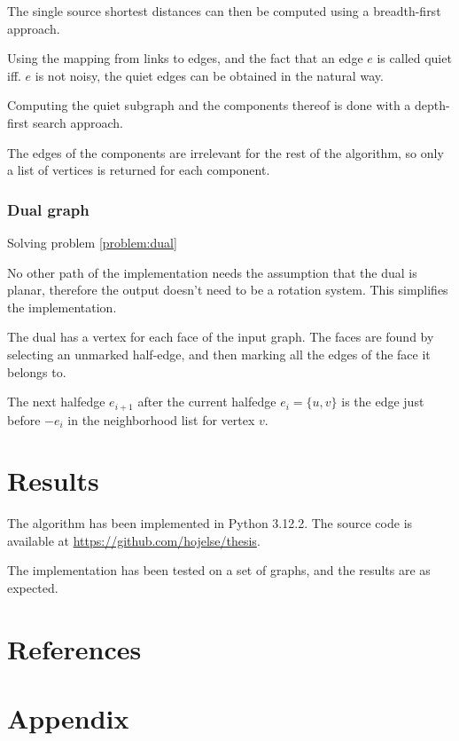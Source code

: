 \documentclass{article}
\begin{document}
			The single source shortest distances can then be computed using a breadth-first approach.

			Using the mapping from links to edges, and the fact that an edge $e$ is called quiet iff. $e$ is not noisy, the quiet edges can be obtained in the natural way.

			Computing the quiet subgraph and the components thereof is done with a depth-first search approach.

			The edges of the components are irrelevant for the rest of the algorithm, so only a list of vertices is returned for each component.


		\subsubsection{Dual graph}\label{impl:dual}

			Solving problem \ref{problem:dual}

			No other path of the implementation needs the assumption that the dual is planar, therefore the output doesn't need to be a rotation system. This simplifies the implementation.

			The dual has a vertex for each face of the input graph. The faces are found by selecting an unmarked half-edge, and then marking all the edges of the face it belongs to.

			The next halfedge $e_{i+1}$ after the current halfedge $e_i = \{u, v\}$ is the edge just before $-e_i$ in the neighborhood list for vertex $v$.



\section{Results}

	The algorithm has been implemented in Python 3.12.2. The source code is available at \url{https://github.com/hojelse/thesis}.
	
	The implementation has been tested on a set of graphs, and the results are as expected. 


\newpage
\section{References}
	\printbibliography

\newpage
\section{Appendix}
\end{document}
